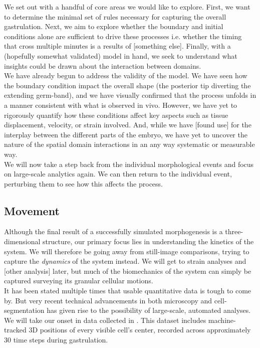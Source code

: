 We set out with a handful of core areas we would like to explore. First, we want to determine the minimal set of rules necessary for capturing the overall gastrulation. Next, we aim to explore whether the boundary and initial conditions alone are sufficient to drive these processes i.e. whether the timing that cross multiple minutes is a results of [something else]. Finally, with a (hopefully somewhat validated) model in hand, we seek to understand what insights could be drawn about the interaction between domains.\\


We have already begun to address the validity of the model. We have seen how the boundary condition impact the overall shape (the posterior tip diverting the extending germ-band), and we have visually confirmed that the process unfolds in a manner consistent with what is observed in vivo. However, we have yet to rigorously quantify how these conditions affect key aspects such as tissue displacement, velocity, or strain involved. And, while we have [found use] for the interplay between the different parts of the embryo, we have yet to uncover the nature of the spatial domain interactions in an any way systematic or measurable way.\reph \\


We will now take a step back from the individual morphological events and focus on large-scale analytics again. We can then return to the individual event, perturbing them to see how this affects the process.



\subsection{Movement}
Although the final result of a successfully simulated morphogenesis is a three-dimensional structure, our primary focus lies in understanding the kinetics of the system. We will therefore be going away from still-image comparisons, trying to capture the \textit{dynamics} of the system instead. We will get to strain analyses and [other analysis] later, but much of the biomechanics of the system can simply be captured surveying its granular cellular motions.\\

It has been stated multiple times that usable quantitative data is tough to come by. But very recent technical advancements in both microscopy and cell-segmentation has given rise to the possibility of large-scale, automated analyses.\cite{stern2022deconstructing} We will take our onset in data collected in . This dataset includes machine-tracked 3D positions of every visible cell’s center, recorded across approximately 30 time steps during gastrulation.\\

